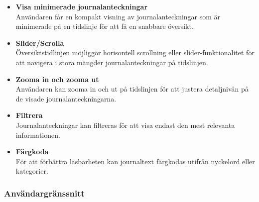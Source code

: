 \documentclass{article}
\begin{document}
\begin{itemize}
    \item \textbf{Visa minimerade journalanteckningar} \\
    Användaren får en kompakt visning av journalanteckningar som är minimerade på en tidslinje för att få en snabbare översikt.

    \item \textbf{Slider/Scrolla} \\
    Översiktstidlinjen möjliggör horisontell scrollning eller slider-funktionalitet för att navigera i stora mängder journalanteckningar på tidslinjen.

    \item \textbf{Zooma in och zooma ut} \\
    Användaren kan zooma in och ut på tidslinjen för att justera detaljnivån på de visade journalanteckningarna.

    \item \textbf{Filtrera} \\
    Journalanteckningar kan filtreras för att visa endast den mest relevanta informationen.

    \item \textbf{Färgkoda} \\
    För att förbättra läsbarheten kan journaltext färgkodas utifrån nyckelord eller kategorier.
\end{itemize}


\subsubsection{Användargränssnitt}
\end{document}

